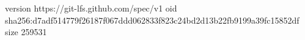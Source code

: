 version https://git-lfs.github.com/spec/v1
oid sha256:d7adf514779f26187f067ddd062833f823c24bd2d13b22fb9199a39fc15852df
size 259531

